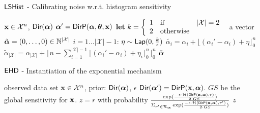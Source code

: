 \documentclass{article}
\begin{document}
\begin{algorithm}
  \caption{$\mathsf{LSHist}$ - Calibrating noise w.r.t. histogram sensitivity}
  \label{ilapmech}
  \begin{algorithmic}
   $\textbf{x}\in\mathcal{X}^n$, $\mathsf{Dir}(\boldsymbol{\alpha})$
  \STATE {} $\boldsymbol{\alpha}' = \mathsf{DirP}(\boldsymbol{\alpha},\boldsymbol{\theta},\textbf{x})$
  \STATE \quad ${\bf let}\ k=\left \{
        \begin{array}{lll}          
          1&\text{if}& |\mathcal{X}|=2\\
          2&\text{otherwise}
        \end{array}
      \right .\ $
  \STATE {} a vector $\tilde{\boldsymbol{\alpha}} = (0, \dots, 0 )\in \mathbb{N}^{|\mathcal{X}|}$ 
  \STATE {} $i = 1 \dots |\mathcal{X}|-1$:
  \STATE \quad {} $\eta \sim \mathsf{Lap}(0, \frac{k}{\epsilon})$
  \STATE \quad \quad  $\tilde{\alpha_i}=\alpha_i + \lfloor{(\alpha_i' - \alpha_i) + \eta}\rfloor^n_0$ 
  \STATE \quad $\tilde{\alpha}_{|\mathcal{X}|} = \alpha_{|\mathcal{X}|} + \lfloor n - \sum_{i = 1}^{|\mathcal{X}|-1}\lfloor{(\alpha_i' - \alpha_i) + \eta_i}\rfloor^n_0 \rfloor^n_0$
   $\tilde{\boldsymbol{\alpha}}$
  \end{algorithmic}
\end{algorithm}
%
%
%
%
%
%
%
%
%
  \begin{algorithm}
  \caption{$\mathsf{EHD}$ - Instantiation
of the exponential mechanism}
  \label{mech:expmech1}
  \begin{algorithmic}
  \STATE observed data set $\textbf{x} \in \mathcal{X}^n$, prior: $\mathsf{Dir}(\boldsymbol{\alpha})$, $\epsilon$
  \STATE {} $\mathsf{Dir}(\boldsymbol{\alpha}')= \mathsf{DirP}(\textbf{x},\boldsymbol{\alpha})$.   
  \STATE {} $GS$ be the global sensitivity for $\textbf{x}$.
  \STATE {} $z=r$ with probability $\frac
  {\exp(\frac{-\epsilon\cdot \mathcal{H}(\mathsf{DirP}(\textbf{x},\boldsymbol{\alpha}), r)}{2\cdot GS})}
{\Sigma_{r' \in \mathcal{R}_{\boldsymbol{\alpha}}}\exp(\frac{-\epsilon\cdot \mathcal{H}(\mathsf{DirP}(\textbf{x},\boldsymbol{\alpha}), r')}{2\cdot GS})}$
 $z$
  \end{algorithmic}
  \end{algorithm}
\end{document}
